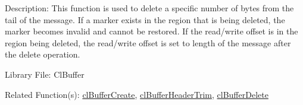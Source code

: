 \begin{Desc}
\item[Description:]This function is used to delete a specific number of bytes from the tail of the message. If a marker exists in the region that is
being deleted, the marker becomes invalid and cannot be restored. If the read/write offset is in the region being deleted, the read/write offset is
set to length of the message after the delete operation.\end{Desc}
\begin{Desc}
\item[Library File:]Cl\-Buffer\end{Desc}
\begin{Desc}
\item[Related Function(s):]\hyperlink{pagebuf103}{cl\-Buffer\-Create}, \hyperlink{pagebuf124}{cl\-Buffer\-Header\-Trim}, 
\hyperlink{pagebuf105}{cl\-Buffer\-Delete} \end{Desc}


\newpage
